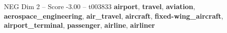 \begin{textsample}{NEG Dim 2 – Score -3.00 – t003833}  \label{ex:f2_neg_038}
\textbf{airport}, \textbf{travel}, \textbf{aviation}, \textbf{aerospace\_engineering}, \textbf{air\_travel}, \textbf{aircraft}, \textbf{fixed-wing\_aircraft}, \textbf{airport\_terminal}, \textbf{passenger}, \textbf{airline}, \textbf{airliner}

\end{textsample}

